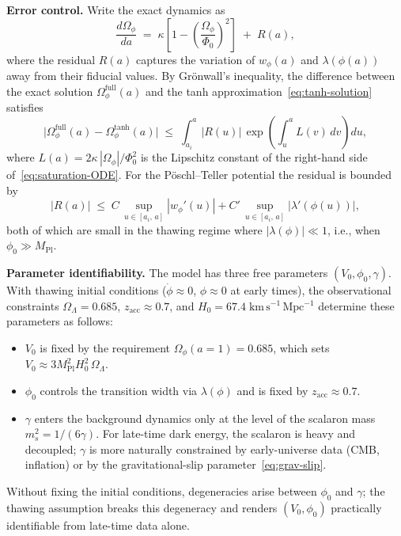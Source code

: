 \documentclass[12pt,a4paper]{article}
\theoremstyle{definition}
\theoremstyle{plain}
\theoremstyle{remark}
\begin{document}
\medskip
\noindent\textbf{Error control.}\;
Write the exact dynamics as
\begin{equation}\label{eq:Omega-rest}
  \frac{d\Omega_\phi}{da}
  \;=\; \kappa\!\left[1 - \left(\frac{\Omega_\phi}{\Phi_0}\right)^{\!2}\right]
  \;+\; R(a),
\end{equation}
where the residual $R(a)$ captures the variation of $w_\phi(a)$ and
$\lambda(\phi(a))$ away from their fiducial values.  By Gr\"onwall's
inequality, the difference between the exact solution
$\Omega_\phi^{\mathrm{full}}(a)$ and the tanh
approximation~\eqref{eq:tanh-solution} satisfies
\begin{equation}\label{eq:Gronwall-error}
  \bigl|\Omega_\phi^{\mathrm{full}}(a)
  - \Omega_\phi^{\mathrm{tanh}}(a)\bigr|
  \;\le\;
  \int_{a_i}^{a} |R(u)|\,
  \exp\!\left(\int_u^a L(v)\,dv\right) du,
\end{equation}
where $L(a) = 2\kappa\,|\Omega_\phi|/\Phi_0^2$ is the Lipschitz constant
of the right-hand side of~\eqref{eq:saturation-ODE}.  For the
P\"oschl--Teller potential the residual is bounded by
\begin{equation}
  |R(a)| \;\le\;
  C\,\sup_{u \in [a_i,\,a]}|w_\phi'(u)|
  + C'\,\sup_{u \in [a_i,\,a]}|\lambda'(\phi(u))|,
\end{equation}
both of which are small in the thawing regime where $|\lambda(\phi)| \ll 1$,
i.e., when $\phi_0 \gg M_{\mathrm{Pl}}$.

\medskip
\noindent\textbf{Parameter identifiability.}\;
The model has three free parameters $(V_0, \phi_0, \gamma)$.
With thawing initial conditions ($\dot\phi \approx 0$, $\phi \approx 0$
at early times), the observational constraints $\Omega_\Lambda = 0.685$,
$z_{\mathrm{acc}} \approx 0.7$, and $H_0 = 67.4\;\mathrm{km\,s^{-1}\,Mpc^{-1}}$
determine these parameters as follows:
\begin{itemize}
  \item $V_0$ is fixed by the requirement
        $\Omega_\phi(a=1) = 0.685$, which sets $V_0 \approx 3M_{\mathrm{Pl}}^2
        H_0^2\,\Omega_\Lambda$.
  \item $\phi_0$ controls the transition width via $\lambda(\phi)$ and is
        fixed by $z_{\mathrm{acc}} \approx 0.7$.
  \item $\gamma$ enters the background dynamics only at the level of the
        scalaron mass $m_s^2 = 1/(6\gamma)$.  For late-time dark energy, the
        scalaron is heavy and decoupled; $\gamma$ is more naturally
        constrained by early-universe data (CMB, inflation) or by the
        gravitational-slip parameter~\eqref{eq:grav-slip}.
\end{itemize}
Without fixing the initial conditions, degeneracies arise between $\phi_0$
and $\gamma$; the thawing assumption breaks this degeneracy and renders
$(V_0, \phi_0)$ practically identifiable from late-time data alone.
\end{document}
